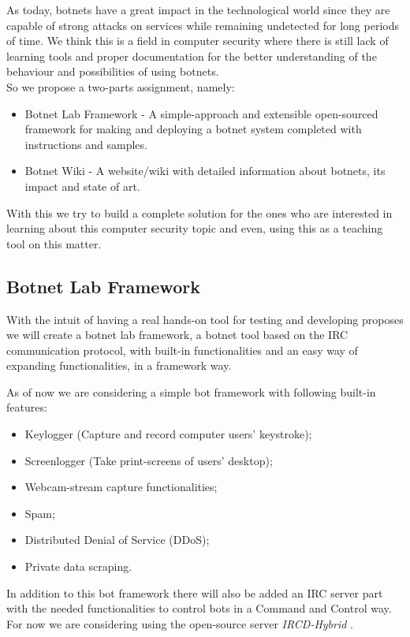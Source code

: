 \documentclass[]{article}
\begin{document}
As today, botnets have a great impact in the technological world since they are capable of strong attacks on services while remaining undetected for long periods of time. We think this is a field in computer security where there is still lack of learning tools and proper documentation for the better understanding of the behaviour and possibilities of using botnets.\\

So we propose a two-parts assignment, namely:
\begin{itemize}
	\item Botnet Lab Framework - A simple-approach and extensible open-sourced framework for making and deploying a botnet system completed with instructions and samples.
	\item Botnet Wiki - A website/wiki with detailed information about botnets, its impact and state of art.
\end{itemize}

With this we try to build a complete solution for the ones who are interested in learning about this computer security topic and even, using this as a teaching tool on this matter.

\subsection{Botnet Lab Framework}

With the intuit of having a real hands-on tool for testing and developing proposes we will create a botnet lab framework, a botnet tool based on the IRC communication protocol, with built-in functionalities and an easy way of expanding functionalities, in a framework way.

As of now we are considering a simple bot framework with following built-in features:

\begin{itemize}
	\item Keylogger (Capture and record computer users' keystroke);
	\item Screenlogger (Take print-screens of users' desktop);
	\item Webcam-stream capture functionalities;
	\item Spam;
	\item Distributed Denial of Service (DDoS);
	\item Private data scraping.
\end{itemize}

In addition to this bot framework there will also be added an IRC server part with the needed functionalities to control bots in a Command and Control way. For now we are considering using the open-source server \textit{IRCD-Hybrid} \cite{app:ircdhybrid}.
\end{document}
